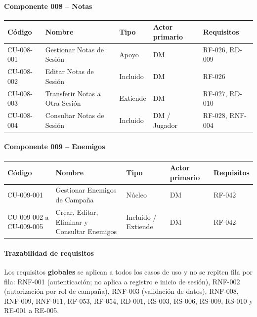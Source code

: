 \paragraph{Componente 008 -- Notas}
{\footnotesize\setlength{\tabcolsep}{4pt}\renewcommand{\arraystretch}{1.15}
\begin{longtable}{|>{\raggedright\arraybackslash}p{1.9cm}|>{\raggedright\arraybackslash}p{4.4cm}|>{\raggedright\arraybackslash}p{1.7cm}|>{\raggedright\arraybackslash}p{2.5cm}|>{\raggedright\arraybackslash}p{4.0cm}|}
\hline
\textbf{Código} & \textbf{Nombre} & \textbf{Tipo} & \textbf{Actor primario} & \textbf{Requisitos} \\ \hline\endhead
CU-008-001 & Gestionar Notas de Sesión & Apoyo & DM & RF-026, RD-009 \\ \hline
CU-008-002 & Editar Notas de Sesión & Incluido & DM & RF-026 \\ \hline
CU-008-003 & Transferir Notas a Otra Sesión & Extiende & DM & RF-027, RD-010 \\ \hline
CU-008-004 & Consultar Notas de Sesión & Incluido & DM / Jugador & RF-028, RNF-004 \\ \hline
\end{longtable}}
\paragraph{Componente 009 -- Enemigos}
{\footnotesize\setlength{\tabcolsep}{4pt}\renewcommand{\arraystretch}{1.15}
\begin{longtable}{|>{\raggedright\arraybackslash}p{1.9cm}|>{\raggedright\arraybackslash}p{4.4cm}|>{\raggedright\arraybackslash}p{1.7cm}|>{\raggedright\arraybackslash}p{2.5cm}|>{\raggedright\arraybackslash}p{4.0cm}|}
\hline
\textbf{Código} & \textbf{Nombre} & \textbf{Tipo} & \textbf{Actor primario} & \textbf{Requisitos} \\ \hline\endhead
CU-009-001 & Gestionar Enemigos de Campaña & Núcleo & DM & RF-042 \\ \hline
CU-009-002 a CU-009-005 & Crear, Editar, Eliminar y Consultar Enemigos & Incluido / Extiende & DM & RF-042 \\ \hline
\end{longtable}}
\paragraph{Trazabilidad de requisitos}
Los requisitos \textbf{globales} se aplican a todos los casos de uso y no se repiten fila por fila: RNF-001 (autenticación; no aplica a registro e inicio de sesión), RNF-002 (autorización por rol de campaña), RNF-003 (validación de datos), RNF-008, RNF-009, RNF-011, RF-053, RF-054, RD-001, RS-003, RS-006, RS-009, RS-010 y RE-001 a RE-005.

